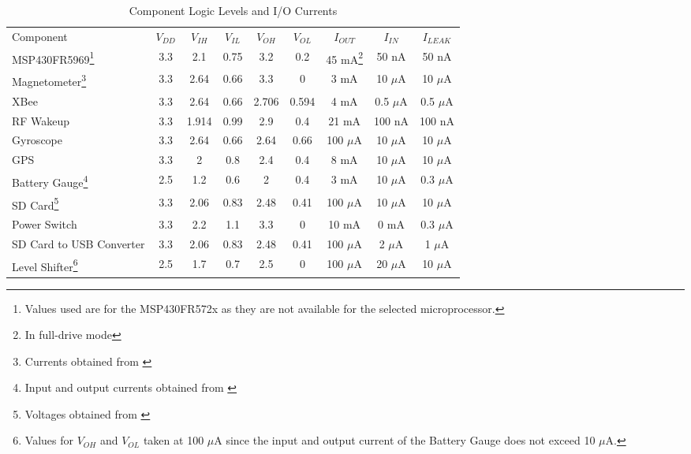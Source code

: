 \begin{table}[ht]
\centering
\caption{Component Logic Levels and I/O Currents  \label{tab:logicCompAndDriving}}
    \begin{tabular}{|p{1.2in}|c|c|c|c|c|c|c|c|}
    
     \hline
    \rowcolor{Gray}
    Component & $V_{DD}$   & $V_{IH}$   & $V_{IL}$   & $V_{OH}$   & $V_{OL}$   & $I_{OUT}$ & $I_{IN}$ & $I_{LEAK}$\\

    MSP430FR5969\footnote{Values used are for the MSP430FR572x as they are not available for the selected microprocessor.} & 3.3   & 2.1   & 0.75  & 3.2   & 0.2   & 45 mA\footnote{In full-drive mode} & 50 nA & 50 nA \\ \hline
 
    Magnetometer\footnote{Currents obtained from \cite{i2cStandard}} & 3.3   & 2.64  & 0.66  & 3.3   & 0    & 3 mA & 10 $\mu$A & 10 $\mu$A  \\ \hline

    XBee  & 3.3   & 2.64   & 0.66   & 2.706   & 0.594  & 4 mA & 0.5 $\mu$A & 0.5 $\mu$A \\ \hline

    RF Wakeup & 3.3   & 1.914 & 0.99  & 2.9   & 0.4  & 21 mA & 100 nA & 100 nA \\ \hline

    Gyroscope & 3.3   & 2.64  & 0.66  & 2.64  & 0.66  & 100 $\mu$A & 10 $\mu$A & 10 $\mu$A \\ \hline

    GPS   & 3.3   & 2     & 0.8   & 2.4   & 0.4 &  8 mA & 10 $\mu$A &  10 $\mu$A  \\ \hline

    Battery Gauge\footnote{Input and output currents obtained from \cite{i2cStandard}} & 2.5   & 1.2   & 0.6   & 2 & 0.4  & 3 mA & 10 $\mu$A & 0.3 $\mu$A \\ \hline

    SD Card\footnote{Voltages obtained from \cite{ibrahim2010sd}} & 3.3 & 2.06   & 0.83   & 2.48   & 0.41 &100 $\mu$A & 10 $\mu$A &  10 $\mu$A\\ \hline

    Power Switch & 3.3   & 2.2   & 1.1   & 3.3   & 0    & 10 mA & 0 mA & 0.3 $\mu$A\\ \hline

    SD Card to USB Converter & 3.3 & 2.06   & 0.83   & 2.48   & 0.41   & 100 $\mu$A & 2 $\mu$A & 1 $\mu$A \\ \hline	
    Level Shifter\footnote{Values for $V_{OH}$ and $V_{OL}$ taken at 100 $\mu$A since the input and output current of the Battery Gauge does not exceed 10 $\mu$A.}& 2.5 & 1.7   & 0.7   & 2.5   & 0   & 100 $\mu$A & 20 $\mu$A & 10 $\mu$A \\ \hline	
    \end{tabular}%

\end{table}%
  
